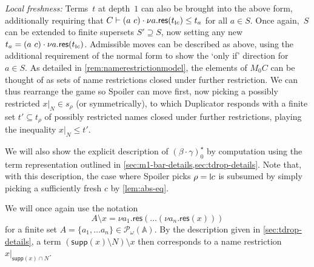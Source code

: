 \documentclass[11pt,a4paper]{amsart}
\newcommand{\res}{\mathsf{res}}
\newcommand{\Names}{\mathbb{A}}
\newcommand{\pow}{\mathcal{P}}
\newcommand{\powf}{\pow_{\omega}}
\newcommand{\supp}{\mathsf{supp}}
\theoremstyle{plain}
\newcommand{\midmid}{\hspace{0.2ex}{\rule[-0.1ex]{0.6pt}{1.65ex}}\hspace{0.2ex}}
\newcommand{\scriptmidmid}{\hspace{0.2ex}{\rule[-0.1ex]{0.6pt}{1.1ex}}\hspace{0.2ex}}
\newcommand{\newletter}[1]{{\midmid}#1}
\newcommand{\scriptnew}[1]{{\scriptmidmid}#1}
\numberwithin{equation}{section}
\newcommand{\+}[1]{\mathcal{#1}\xspace}
\theoremstyle{definition}
\begin{document}
\noindent\emph{Local freshness:}
Terms~$t$ at depth~$1$ can also be brought into the above form, additionally requiring that $C \vdash (a\ c) \cdot \nu a.\res(t_{\scriptnew{c}}) \le t_a$ for all $a \in S$.
Once again,~$S$ can be extended to finite supersets $S' \supseteq S$, now setting any new $t_a = (a\ c) \cdot \nu a.\res(t_{\scriptnew{c}})$.
Admissible moves can be described as above, using the additional requirement of the normal form to show the `only if' direction for $a \in S$.
As detailed in \cref{rem:namerestrictionmodel}, the elements of $M_0C$ can be thought of as sets of name restrictions closed under further restriction.
We can thus rearrange the game so Spoiler can move first, now picking a possibly restricted $x|_N \in s_\rho$ (or symmetrically), to which Duplicator responds with a finite set $t' \subseteq t_\rho$ of possibly restricted names closed under further restrictions, playing the inequality $x|_N \le t'$.

We will also show the explicit description of $(\beta \cdot \gamma)^\star_0$ by computation using the term representation outlined in \cref{sec:m1-bar-details,sec:tdrop-details}.
Note that, with this description, the case where Spoiler picks $\rho = \newletter{c}$ is subsumed by simply picking a sufficiently fresh $c$ by \cref{lem:abs-eq}.

We will once again use the notation
\begin{equation*}
  A \setminus x = \nu a_1.\res(\dots(\nu a_n.\res(x)))
\end{equation*}
for a finite set $A = \{a_1, \dots a_n\} \in \powf(\Names)$.
By the description given in \cref{sec:tdrop-details}, a term $(\supp(x) \setminus N) \setminus x$ then corresponds to a name restriction $x|_{\supp(x) \cap N}$.
\end{document}

